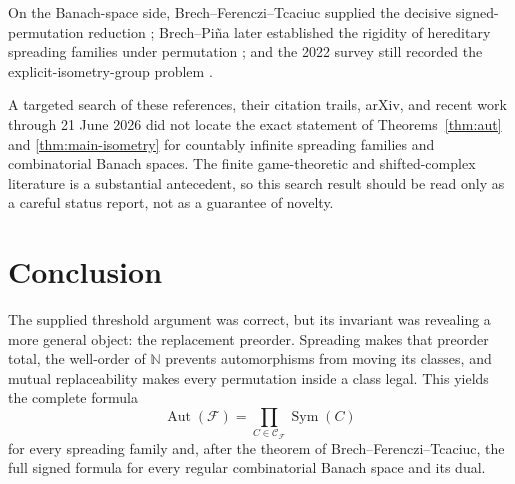 \documentclass[11pt]{article}
\theoremstyle{definition}
\theoremstyle{remark}
\newcommand{\N}{\mathbb N}
\newcommand{\F}{\mathcal F}
\newcommand{\Ccal}{\mathcal C}
\newcommand{\Aut}{\operatorname{Aut}}
\newcommand{\Sym}{\operatorname{Sym}}
\begin{document}
On the Banach-space side, Brech--Ferenczi--Tcaciuc supplied the decisive
signed-permutation reduction \cite{BFT}; Brech--Pi\~na later established the
rigidity of hereditary spreading families under permutation
\cite{BP}; and the 2022 survey still recorded the explicit-isometry-group
problem \cite{ABsurvey}.

A targeted search of these references, their citation trails, arXiv, and
recent work through 21 June 2026 did not locate the exact statement of
Theorems~\ref{thm:aut} and \ref{thm:main-isometry} for countably infinite
spreading families and combinatorial Banach spaces.  The finite game-theoretic
and shifted-complex literature is a substantial antecedent, so this search
result should be read only as a careful status report, not as a guarantee of
novelty.

\section{Conclusion}

The supplied threshold argument was correct, but its invariant was revealing
a more general object: the replacement preorder.  Spreading makes that
preorder total, the well-order of $\N$ prevents automorphisms from moving its
classes, and mutual replaceability makes every permutation inside a class
legal.  This yields the complete formula
\[
  \Aut(\F)=\prod_{C\in\Ccal_{\F}}\Sym(C)
\]
for every spreading family and, after the theorem of
Brech--Ferenczi--Tcaciuc, the full signed formula for every regular
combinatorial Banach space and its dual.
\end{document}
